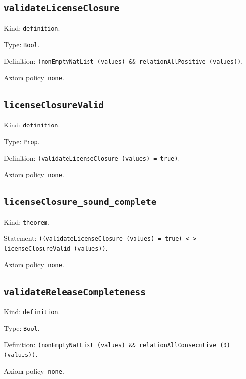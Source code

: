 \documentclass[11pt]{article}
\begin{document}
\subsection*{\texttt{validateLicenseClosure}}
\noindent Kind: \texttt{definition}.\par
\noindent Type: \texttt{Bool}.\par
\noindent Definition: \texttt{(nonEmptyNatList (values) \&\& relationAllPositive (values))}.\par
\noindent Axiom policy: \texttt{none}.\par
\subsection*{\texttt{licenseClosureValid}}
\noindent Kind: \texttt{definition}.\par
\noindent Type: \texttt{Prop}.\par
\noindent Definition: \texttt{(validateLicenseClosure (values) = true)}.\par
\noindent Axiom policy: \texttt{none}.\par
\subsection*{\texttt{licenseClosure\_sound\_complete}}
\noindent Kind: \texttt{theorem}.\par
\noindent Statement: \texttt{((validateLicenseClosure (values) = true) <-> licenseClosureValid (values))}.\par
\noindent Axiom policy: \texttt{none}.\par
\subsection*{\texttt{validateReleaseCompleteness}}
\noindent Kind: \texttt{definition}.\par
\noindent Type: \texttt{Bool}.\par
\noindent Definition: \texttt{(nonEmptyNatList (values) \&\& relationAllConsecutive (0) (values))}.\par
\noindent Axiom policy: \texttt{none}.\par
\end{document}
